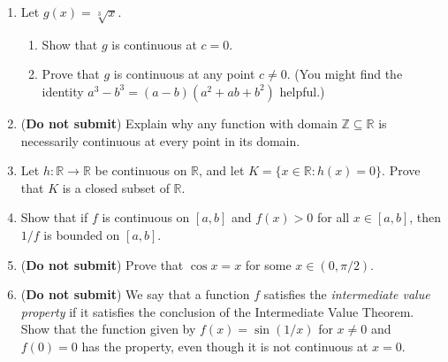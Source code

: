 \documentclass[letterpaper,12pt]{article}
\newcommand{\R}{\mathbb{R}}
\newcommand{\Z}{\mathbb{Z}}
\begin{document}
\begin{enumerate}
\item Let $g(x)=\sqrt[3]{x}$.
\begin{enumerate}
 \item Show that $g$ is continuous at $c=0$.
 \item Prove that $g$ is continuous at any point $c\neq 0$. (You might find the identity $a^3-b^3=(a-b)(a^2+ab+b^2)$ helpful.)
\end{enumerate}
 \item ({\bf Do not submit}) Explain why any function with domain $\Z\subseteq \R$ is necessarily continuous at every point in its domain.
 \item Let $h:\R\to\R$ be continuous on $\R$, and let $K=\{x\in \R : h(x)=0\}$. Prove that $K$ is a closed subset of $\R$.
 \item Show that if $f$ is continuous on $[a,b]$ and $f(x)>0$ for all $x\in [a,b]$, then $1/f$ is bounded on $[a,b]$.
 \item ({\bf Do not submit}) Prove that $\cos x = x$ for some $x\in (0,\pi/2)$.
 \item ({\bf Do not submit}) We say that a function $f$ satisfies the {\em intermediate value property} if it satisfies the conclusion of the Intermediate Value Theorem. Show that the function given by $f(x)=\sin (1/x)$ for $x\neq 0$ and $f(0)=0$ has the property, even though it is not continuous at $x=0$.


\end{enumerate}
\end{document}
